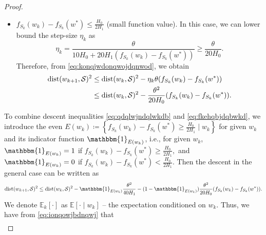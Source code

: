 \documentclass[a4paper,11pt]{article}
\newcommand{\E}[1]{\mathbb{E}\left[#1\right]}
\newcommand{\Ek}[1]{\mathbb{E}_k\left[#1\right]}
\newcommand{\cS}{\mathcal{S}}
\newcommand{\1}{\mathbbm{1}}
\newcommand{\eqdef}{\coloneqq}
\theoremstyle{plain}
\begin{document}
\begin{proof}
\begin{itemize}
        \[
        \eta_k = \frac{\theta}{10H_0+20H_1(f_{S_k}(w_k)-f_{S_k}(w^*))} \ge \frac{\theta}{40H_1(f_{S_k}(w_k)-f_{S_k}(w^*))}.
        \]
        Therefore, from \eqref{eq:konqjwdonqwojdqnwod}, we obtain
        \begin{align}
            {\rm dist}(w_{k+1},\cS)^2 &\le {\rm dist}(w_k,\cS)^2 - \eta_k\theta(f_{S_k}(w_k)-f_{S_k}(w^*))\notag\\
            &\le {\rm dist}(w_k,\cS)^2 - \frac{\theta^2}{40H_1(f_{S_k}(w_k)-f_{S_k}(w^*))}(f_{S_k}(w_k)-f_{S_k}(w^*))\notag\\
            &= {\rm dist}(w_k,\cS)^2 - \frac{\theta^2}{40H_1}.\label{eq:qdqlwjndqlwkdb}
        \end{align}

        \item $f_{S_k}(w_k)-f_{S_k}(w^*) \le \frac{H_0}{2H_1}$ (small function value). In this case, we can lower bound the step-size $\eta_k$ as
        \[
        \eta_k = \frac{\theta}{10H_0+20H_1(f_{S_k}(w_k)-f_{S_k}(w^*))} \ge \frac{\theta}{20H_0}.
        \]
        Therefore, from \eqref{eq:konqjwdonqwojdqnwod}, we obtain
        \begin{align}\label{eq:fkehqbjdqbwkd}
            {\rm dist}(w_{k+1},\cS)^2 &\le 
            {\rm dist}(w_k,\cS)^2 - \eta_k\theta(f_{S_k}(w_k)-f_{S_k}(w^*))\notag\\
            &\le {\rm dist}(w_k,\cS)^2 - \frac{\theta^2}{20H_0}(f_{S_k}(w_k)-f_{S_k}(w^*)).
        \end{align}
    \end{itemize}
    To combine descent inequalities \eqref{eq:qdqlwjndqlwkdb} and \eqref{eq:fkehqbjdqbwkd}, we introduce the even $E(w_k)\eqdef \left\{f_{S_k}(w_k)-f_{S_k}(w^*) \ge \frac{H_0}{2H_1} \mid w_k\right\}$ for given $w_k$ and its indicator function $\1_{E(w_k)}$, i.e., for given $w_k$, $\1_{E(w_k)} = 1$ if $f_{S_k}(w_k)-f_{S_k}(w^*) \ge \frac{H_0}{2H_1},$ and $\1_{E(w_k)} = 0$ if $f_{S_k}(w_k)-f_{S_k}(w^*) < \frac{H_0}{2H_1}.$ Then the descent in the general case can be written as
    \begin{align}\label{eq:ionqowjbdnqwj}
        {\rm dist}(w_{k+1},\cS)^2 \le {\rm dist}(w_k,\cS)^2 - \1_{E(w_k)}\frac{\theta^2}{40H_1} - (1-\1_{E(w_k)})\frac{\theta^2}{20H_0}(f_{S_k}(w_k)-f_{S_k}(w^*)).
    \end{align}
    We denote $\Ek{\cdot}$ as $\E{\cdot \mid w_k}$ -- the expectation conditioned on $w_k.$ Thus, we have from \eqref{eq:ionqowjbdnqwj} that 
    \begin{align}

\end{align}
\end{proof}
\end{document}
